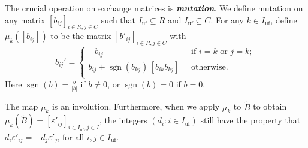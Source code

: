 \documentclass{amsart}
\newtheorem{prop}[proposition]{Proposition}
\theoremstyle{definition}
\theoremstyle{remark}
\numberwithin{equation}{section}
\newcommand{\margincolor}{red}
\newcommand{\marginauthorcolor}{darkgreen}
\newcounter{margincounter}
\newcommand{\marginnum}{
\ifnum\value{margincounter}<10
\textcolor{\margincolor}{\begin{picture}(0,0)\put(2.2,2.4){\circle{9}}\end{picture}\footnotesize\arabic{margincounter}}
\else\ifnum\value{margincounter}<100
\textcolor{\margincolor}{\begin{picture}(0,0)\put(4.256,2.5){\circle{11}}\end{picture}\footnotesize\arabic{margincounter}}
\else
\textcolor{\margincolor}{\begin{picture}(0,0)\put(6.8,2.5){\circle{14}}\end{picture}\footnotesize\arabic{margincounter}}
\fi\fi
}
\newcommand{\margin}[2][]
{\!\!\refstepcounter{margincounter}\marginnum\marginpar{\textcolor{\margincolor}{\arabic{margincounter}.}\,\,\tiny #2\,\,\,\textcolor{\marginauthorcolor}{\small#1}}}
\newcommand{\newword}[1]{\textbf{\emph{#1}}}
\newcommand{\ep}{\varepsilon}
\newcommand{\sgn}{\operatorname{sgn}}
\newcommand{\uf}{{\operatorname{uf}}}
\newcommand{\set}[1]{{\lbrace #1 \rbrace}}
\newcommand{\D}{{\mathfrak D}}
\newcommand{\0}{{\mathbf{0}}}
\newcommand{\s}{\mathbf{s}}
\newcommand{\m}{\mathbf{m}}
\newcommand{\tB}{\tilde{B}}
\newcommand{\Scat}{\operatorname{Scat}}
\renewcommand{\d}{{\mathfrak d}}
\begin{document}
%
%
%
%

The crucial operation on exchange matrices is \newword{mutation}.
We define mutation on any matrix $[b_{ij}]_{i\in R,j\in C}$ such that $I_\uf\subseteq R$ and $I_\uf\subseteq C$.
For any $k\in I_\uf$, define $\mu_k([b_{ij}])$ to be the matrix $[b'_{ij}]_{i\in R,j\in C}$ with
\begin{equation}\label{b mut}
b_{ij}'=\left\lbrace\!\!\begin{array}{ll}
-b_{ij}&\mbox{if }i=k\mbox{ or }j=k;\\
b_{ij}+\sgn(b_{kj})\,[b_{ik}b_{kj}]_+&\mbox{otherwise.}
\end{array}\right.
\end{equation}
Here $\sgn(b)=\frac{b}{|b|}$ if $b\neq0$, or $\sgn(b)=0$ if $b=0$.

The map $\mu_k$ is an involution.
Furthermore, when we apply $\mu_k$ to $\tB$ to obtain $\mu_k(\tB)=[\ep'_{ij}]_{i\in I_\uf,j\in I}$, the integers $(d_i:i\in I_\uf)$ still have the property that $d_i\ep'_{ij}=-d_j\ep'_{ji}$ for all $i,j\in I_\uf$.
\end{document}
